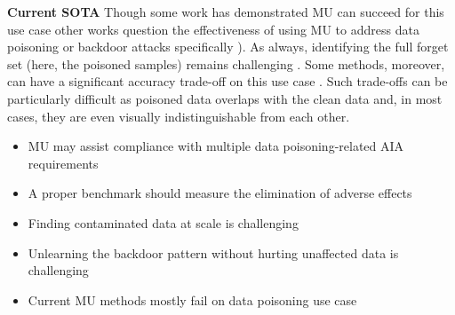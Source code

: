 \textbf{Current SOTA} Though some work has demonstrated MU can succeed for this use case \citep{warnecke2023machineunlearningfeatureslabels, schoepf2024potionpoisonunlearning} other works question the effectiveness of using MU to address data poisoning or backdoor attacks specifically \citep{8685687, 10.1007/978-3-030-58951-6_24, pawelczyk2024machineunlearningfailsremove, xu2024machineunlearningtraditionalmodels}). As always, identifying the full forget set (here, the poisoned samples) remains challenging \citep{goel2024correctivemachineunlearning}. Some methods, moreover, can have a significant accuracy trade-off on this use case \citep{pawelczyk2024machineunlearningfailsremove}. Such trade-offs can be particularly difficult as poisoned data overlaps with the clean data and, in most cases, they are even visually indistinguishable from each other.  

\begin{tcolorbox}[colback=green!10,colframe=black!50,title=Key Points]
\begin{itemize}[leftmargin=0pt]
    \item MU may assist compliance with multiple data poisoning-related AIA requirements
    \item A proper benchmark should measure the elimination of adverse effects
\end{itemize}
\end{tcolorbox}

\begin{tcolorbox}[colback=red!10,colframe=black!50,title=Open Problems]
\begin{itemize}[leftmargin=0pt]
    \item Finding contaminated data at scale is challenging 
    \item Unlearning the backdoor pattern without hurting unaffected data is challenging 
        \item Current MU methods mostly fail on data poisoning use case
\end{itemize}


\end{tcolorbox}



